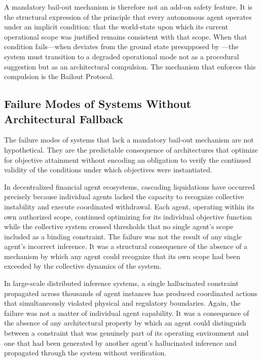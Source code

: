 A mandatory bail-out mechanism is therefore not an add-on safety feature. It is the structural expression of the principle that every autonomous agent operates under an implicit condition: that the world-state upon which its current operational scope was justified remains consistent with that scope. When that condition fails—when \fact deviates from the ground state presupposed by \purpose—the system must transition to a degraded operational mode not as a procedural suggestion but as an architectural compulsion. The mechanism that enforces this compulsion is the Bailout Protocol.

\subsection{Failure Modes of Systems Without Architectural Fallback}

The failure modes of systems that lack a mandatory bail-out mechanism are not hypothetical. They are the predictable consequence of architectures that optimize for objective attainment without encoding an obligation to verify the continued validity of the conditions under which objectives were instantiated.

In decentralized financial agent ecosystems, cascading liquidations have occurred precisely because individual agents lacked the capacity to recognize collective instability and execute coordinated withdrawal. Each agent, operating within its own authorized scope, continued optimizing for its individual objective function while the collective system crossed thresholds that no single agent's scope included as a binding constraint. The failure was not the result of any single agent's incorrect inference. It was a structural consequence of the absence of a mechanism by which any agent could recognize that its own scope had been exceeded by the collective dynamics of the system.

In large-scale distributed inference systems, a single hallucinated constraint propagated across thousands of agent instances has produced coordinated actions that simultaneously violated physical and regulatory boundaries. Again, the failure was not a matter of individual agent capability. It was a consequence of the absence of any architectural property by which an agent could distinguish between a constraint that was genuinely part of its operating environment and one that had been generated by another agent's hallucinated inference and propagated through the system without verification.

